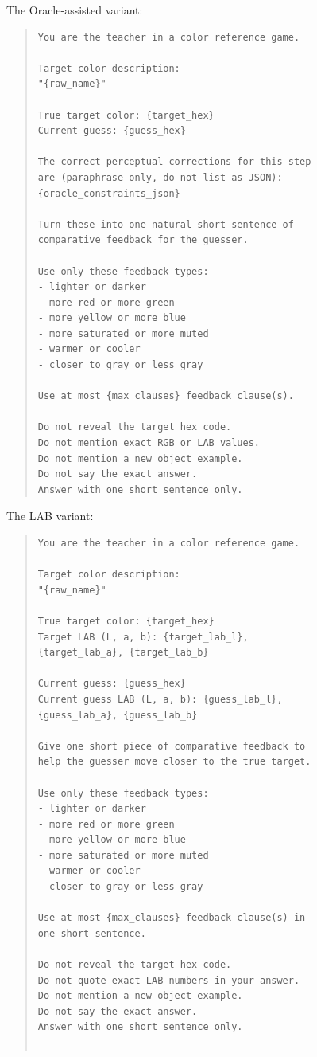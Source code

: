 \documentclass[11pt]{article}
\begin{document}
The Oracle-assisted variant: 
\begin{quote}
\small
\begin{verbatim}
You are the teacher in a color reference game.

Target color description:
"{raw_name}"

True target color: {target_hex}
Current guess: {guess_hex}

The correct perceptual corrections for this step 
are (paraphrase only, do not list as JSON):
{oracle_constraints_json}

Turn these into one natural short sentence of 
comparative feedback for the guesser.

Use only these feedback types:
- lighter or darker
- more red or more green
- more yellow or more blue
- more saturated or more muted
- warmer or cooler
- closer to gray or less gray

Use at most {max_clauses} feedback clause(s).

Do not reveal the target hex code.
Do not mention exact RGB or LAB values.
Do not mention a new object example.
Do not say the exact answer.
Answer with one short sentence only.
\end{verbatim}
\end{quote}

The LAB variant: 
\begin{quote}
\small
\begin{verbatim}
You are the teacher in a color reference game.

Target color description:
"{raw_name}"

True target color: {target_hex}
Target LAB (L, a, b): {target_lab_l}, 
{target_lab_a}, {target_lab_b}

Current guess: {guess_hex}
Current guess LAB (L, a, b): {guess_lab_l}, 
{guess_lab_a}, {guess_lab_b}

Give one short piece of comparative feedback to 
help the guesser move closer to the true target.

Use only these feedback types:
- lighter or darker
- more red or more green
- more yellow or more blue
- more saturated or more muted
- warmer or cooler
- closer to gray or less gray

Use at most {max_clauses} feedback clause(s) in 
one short sentence.

Do not reveal the target hex code.
Do not quote exact LAB numbers in your answer.
Do not mention a new object example.
Do not say the exact answer.
Answer with one short sentence only.


\end{verbatim}
\end{quote}
\end{document}
